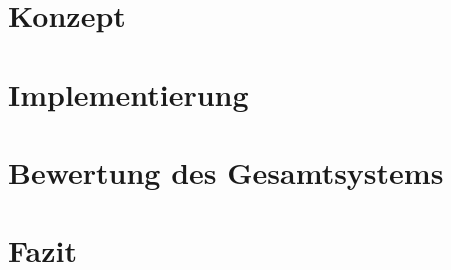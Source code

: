 \documentclass[12pt,a4paper,twoside]{report}
\theoremstyle{definition}
\begin{document}
	\chapter{Konzept}
	\label{ch:Konzept}  	
		
    \cleardoublepage    
    
    \chapter{Implementierung}
    \label{ch:implementierung}   
   		
   		
    \chapter{Bewertung des Gesamtsystems}
	\label{ch:Bewertung}  
		
    \cleardoublepage    

    \chapter{Fazit}
    \label{ch:Fazit}    
    	
    \cleardoublepage
    
\nocite{*}


		
		\cleardoublepage
    \appendix

%    
		\cleardoublepage

    \listoftables
    	\cleardoublepage
    \listoffigures
    	\cleardoublepage
    \printindex
    	\cleardoublepage
    \printnomenclature
    \renewcommand{\leftmark}{\uppercase{Abkürzungsverzeichnis}}
    	\cleardoublepage
\end{document}
